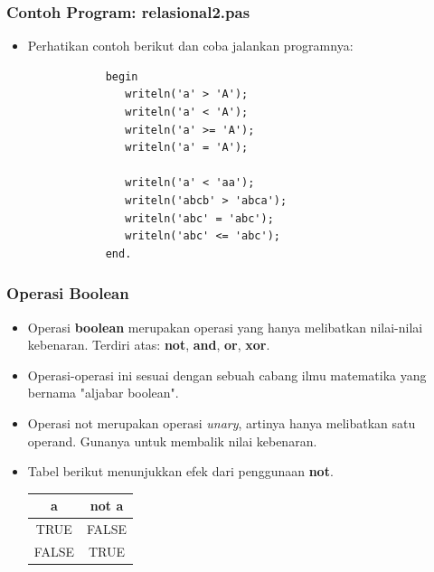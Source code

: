 \documentclass{beamer}
\begin{document}
\begin{frame}[fragile]
\frametitle{Contoh Program: relasional2.pas}
\begin{itemize}
	\item Perhatikan contoh berikut dan coba jalankan programnya:
		\begin{lstlisting}
			begin
			   writeln('a' > 'A');
			   writeln('a' < 'A');
			   writeln('a' >= 'A');
			   writeln('a' = 'A');
			
			   writeln('a' < 'aa');
			   writeln('abcb' > 'abca');
			   writeln('abc' = 'abc');
			   writeln('abc' <= 'abc');
			end.
		\end{lstlisting}
\end{itemize}
\end{frame}

\begin{frame}
\frametitle{Operasi Boolean}
\begin{itemize}
	\item Operasi \textbf{boolean} merupakan operasi yang hanya melibatkan nilai-nilai kebenaran. Terdiri atas: \textbf{not}, \textbf{and}, \textbf{or}, \textbf{xor}.
	\item Operasi-operasi ini sesuai dengan sebuah cabang ilmu matematika yang bernama "aljabar boolean".
	\item Operasi \alert{not} merupakan operasi \textit{unary}, artinya hanya melibatkan satu operand. Gunanya untuk membalik nilai kebenaran.
	\item Tabel berikut menunjukkan efek dari penggunaan \textbf{not}.
	\begin{tabular}{|c|c|}
	\hline a & not a \\ 
	\hline TRUE & FALSE \\ 
	\hline FALSE & TRUE \\ 
	\hline 
	\end{tabular} 
\end{itemize}
\end{frame}
\end{document}
